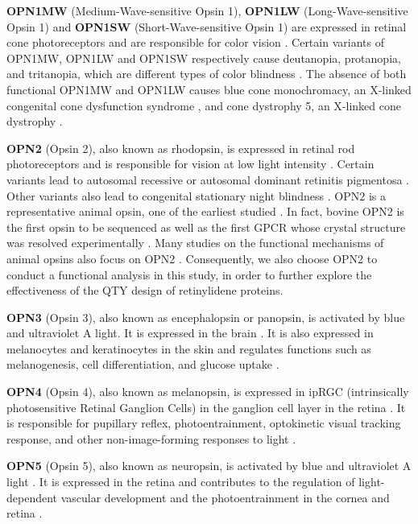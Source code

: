 \documentclass[fleqn,10pt,lineno]{manuscript}
\begin{document}
\textbf{OPN1MW} (Medium-Wave-sensitive Opsin 1), \textbf{OPN1LW} (Long-Wave-sensitive Opsin 1) and \textbf{OPN1SW} (Short-Wave-sensitive Opsin 1) are expressed in retinal cone photoreceptors and are responsible for color vision \citep{Bowmaker_1980}. Certain variants of OPN1MW, OPN1LW and OPN1SW respectively cause deutanopia, protanopia, and tritanopia, which are different types of color blindness \citep{Ueyama_2002, Baraas_2012}. The absence of both functional OPN1MW and OPN1LW causes blue cone monochromacy, an X-linked congenital cone dysfunction syndrome \citep{Wissinger_2022}, and cone dystrophy 5, an X-linked cone dystrophy \citep{Gardner_2010}. 

\textbf{OPN2} (Opsin 2), also known as rhodopsin, is expressed in retinal rod photoreceptors and is responsible for vision at low light intensity \citep{Hubbard_1958}. Certain variants lead to autosomal recessive or autosomal dominant retinitis pigmentosa \citep{Fanelli_2021}. Other variants also lead to congenital stationary night blindness \citep{Fanelli_2021}. OPN2 is a representative animal opsin, one of the earliest studied \citep{Hubbard_1958}. In fact, bovine OPN2 is the first opsin to be sequenced \citep{Nathans_1984} as well as the first GPCR whose crystal structure was resolved experimentally \citep{Palczeski_2000}. Many studies on the functional mechanisms of animal opsins also focus on OPN2 \citep{Park_2008, Scheerer_2008, Kimata_2016}. Consequently, we also choose OPN2 to conduct a functional analysis in this study, in order to further explore the effectiveness of the QTY design of retinylidene proteins. 

\textbf{OPN3} (Opsin 3), also known as encephalopsin or panopsin, is activated by blue and ultraviolet A light. It is expressed in the brain \citep{Blackshaw_1999}. It is also expressed in melanocytes and keratinocytes in the skin and regulates functions such as melanogenesis, cell differentiation, and glucose uptake \citep{Koyanagi_2013, Olinski_2020}. 

\textbf{OPN4} (Opsin 4), also known as melanopsin, is expressed in ipRGC (intrinsically photosensitive Retinal Ganglion Cells) in the ganglion cell layer in the retina \citep{Provencio_1998}. It is responsible for pupillary reflex, photoentrainment, optokinetic visual tracking response, and other non-image-forming responses to light \citep{Berson_2002, Gooley_2003}. 

\textbf{OPN5} (Opsin 5), also known as neuropsin, is activated by blue and ultraviolet A light \citep{Tarttelin_2003, Yamashita_2010}. It is expressed in the retina and contributes to the regulation of light-dependent vascular development \citep{Nguyen_2019} and the photoentrainment in the cornea and retina \citep{Buhr_2015}. 
\end{document}
